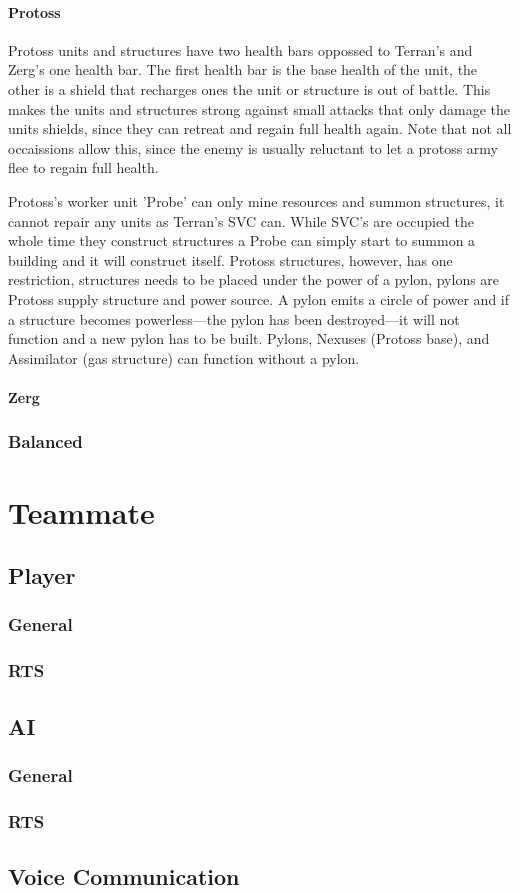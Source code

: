 \paragraph{Protoss}
Protoss units and structures have two health bars oppossed to Terran's and Zerg's one health bar. The first health bar is the base health of the unit, the other is a shield that recharges ones the unit or structure is out of battle. This makes the units and structures strong against small attacks that only damage the units shields, since they can retreat and regain full health again. Note that not all occaissions allow this, since the enemy is usually reluctant to let a protoss army flee to regain full health.

Protoss's worker unit 'Probe' can only mine resources and summon structures, it cannot repair any units as Terran's SVC can. While SVC's are occupied the whole time they construct structures a Probe can simply start to summon a building and it will construct itself. Protoss structures, however, has one restriction, structures needs to be placed under the power of a pylon, pylons are Protoss supply structure and power source. A pylon emits a circle of power and if a structure becomes powerless—the pylon has been destroyed—it will not function and a new pylon has to be built. Pylons, Nexuses (Protoss base), and Assimilator (gas structure) can function without a pylon.

\paragraph{Zerg}

\subsubsection{Balanced}

\section{Teammate}

\subsection{Player}

\subsubsection{General}

\subsubsection{RTS}

\subsection{AI}

\subsubsection{General}

\subsubsection{RTS}

\subsection{Voice Communication}